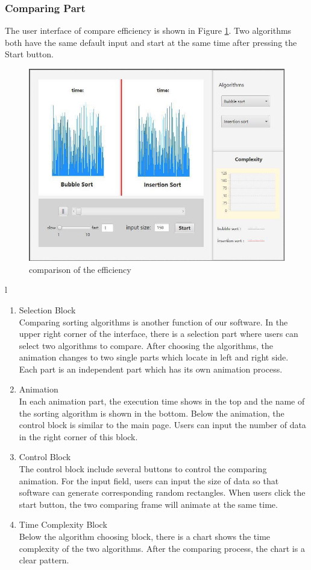 \documentclass[paper=a4, fontsize=11pt,twoside]{scrartcl}		%
\begin{document}
\subsubsection{Comparing Part}
The user interface of compare efficiency is shown in Figure \ref{comparison}. Two algorithms both have the same default input and start at the same time after pressing the Start button.
\begin{figure}[htbp]
\centering
\includegraphics[width=.8\textwidth]{comparison.JPG}
\caption{comparison of the efficiency}
\label{comparison}
\end{figure}l

\begin{enumerate}
\item Selection Block\\
Comparing sorting algorithms is another function of our software. In the upper right corner of the interface, there is a selection part where users can select two algorithms to compare. After choosing the algorithms, the animation changes to two single parts which locate in left and right side. Each part is an independent part which has its own animation process. 

\item Animation\\
In each animation part, the execution time shows in the top and the name of the sorting algorithm is shown in the bottom. Below the animation, the control block is similar to the main page. Users can input the number of data in the right corner of this block.

\item Control Block\\
The control block include several buttons to control the comparing animation. For the input field, users can input the size of data so that software can generate corresponding random rectangles. When users click the start button, the two comparing frame will animate at the same time.

\item Time Complexity Block\\
Below the algorithm choosing block, there is a chart shows the time complexity of the two algorithms. After the comparing process, the chart is a clear pattern.\\

\end{enumerate}
\end{document}
